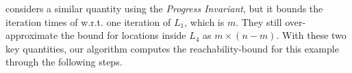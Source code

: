 \cite{GulwaniJK09} considers a similar quantity using the \emph{Progress Invariant}, but it bounds the iteration times of  w.r.t. one iteration of $L_1$, which is $m$. They still over-approximate the bound for locations inside $L_4$ as $m \times (n - m)$.
With these two key quantities, our algorithm computes the reachability-bound for this example through the following steps.
